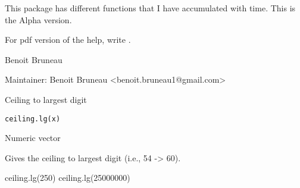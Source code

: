 \documentclass[a4paper]{book}
\begin{document}
\newpage
{}
%
\begin{Description}\relax
This package has different functions that I have accumulated with time. This is the Alpha version.
\end{Description}
%
\begin{Format}

\end{Format}
%
\begin{Details}\relax
For pdf version of the help, write .
\end{Details}
%
\begin{Author}\relax
Benoit Bruneau

Maintainer: Benoit Bruneau <benoit.bruneau1@gmail.com>

\end{Author}
\newpage
{}
%
\begin{Description}\relax
Ceiling to largest digit
\end{Description}
%
\begin{Usage}
\begin{verbatim}
ceiling.lg(x)
\end{verbatim}
\end{Usage}
%
\begin{Arguments}
\begin{ldescription}
\item[\code{x }] Numeric vector

\end{ldescription}
\end{Arguments}
%
\begin{Details}\relax
Gives the  ceiling to largest digit (i.e., 54 -> 60).
\end{Details}
%
\begin{Examples}
\begin{ExampleCode}
ceiling.lg(250)
ceiling.lg(25000000)
\end{ExampleCode}
\end{Examples}
\newpage
{}
\end{document}
